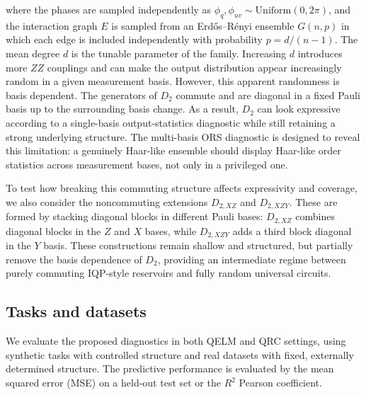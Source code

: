 \documentclass[
    aps,
    pre,
    amsmath,
    amssymb,
    reprint,
    superscriptaddress,
    preprintnumbers,
]{revtex4-2}
\begin{document}
where the phases are sampled independently as $\phi_q,\phi_{uv}\sim\mathrm{Uniform}(0,2\pi)$, and the interaction graph $E$ is sampled from an Erd\H{o}s--R\'enyi ensemble $G(n,p)$ in which each edge is included independently with probability $p=d/(n-1)$. The mean degree $d$ is the tunable parameter of the family. Increasing $d$ introduces more $ZZ$ couplings and can make the output distribution appear increasingly random in a given measurement basis. However, this apparent randomness is basis dependent. The generators of $D_2$ commute and are diagonal in a fixed Pauli basis up to the surrounding basis change. As a result, $D_2$ can look expressive according to a single-basis output-statistics diagnostic while still retaining a strong underlying structure. The multi-basis ORS diagnostic is designed to reveal this limitation: a genuinely Haar-like ensemble should display Haar-like order statistics across measurement bases, not only in a privileged one.

To test how breaking this commuting structure affects expressivity and coverage, we also consider the noncommuting extensions $D_{2,XZ}$ and $D_{2,XZY}$. These are formed by stacking diagonal blocks in different Pauli bases: $D_{2,XZ}$ combines diagonal blocks in the $Z$ and $X$ bases, while $D_{2,XZY}$ adds a third block diagonal in the $Y$ basis. These constructions remain shallow and structured, but partially remove the basis dependence of $D_2$, providing an intermediate regime between purely commuting IQP-style reservoirs and fully random universal circuits.

\subsection{Tasks and datasets}
\label{sec:methods-tasks}

We evaluate the proposed diagnostics in both QELM and QRC settings, using synthetic tasks with controlled structure and real datasets with fixed, externally determined structure. The predictive performance is evaluated by the mean squared error (MSE) on a held-out test set or the $R^2$ Pearson coefficient.
\end{document}
